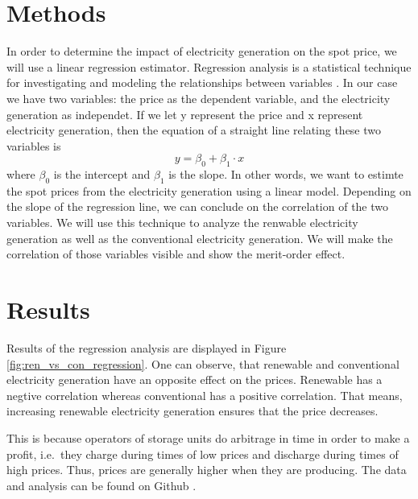 \documentclass{article}
\begin{document}
\section{Methods}

In order to determine the impact of electricity generation on the spot price, we will use a linear regression estimator. 
Regression analysis is a statistical technique for investigating and modeling the relationships between variables \citep{montgomery2021introduction}. 
In our case we have two variables: the price as the dependent variable, and the electricity generation as independet.
If we let y represent the price and x represent electricity generation, then the equation of a straight line relating these two variables is 
\begin{equation}
    y = \beta_0 + \beta_1\cdot x
\end{equation}
where $\beta_0$ is the intercept and $\beta_1$ is the slope.
In other words, we want to estimte the spot prices from the electricity generation using a linear model.
Depending on the slope of the regression line, we can conclude on the correlation of the two variables. 
We will use this technique to analyze the renwable electricity generation as well as the conventional electricity generation.
We will make the correlation of those variables visible and show the merit-order effect. 


\section{Results}

Results of the regression analysis are displayed in Figure \ref{fig:ren_vs_con_regression}. 
One can observe, that renewable and conventional electricity generation have an opposite effect on the prices. 
Renewable has a negtive correlation whereas conventional has a positive correlation. 
That means, increasing renewable electricity generation ensures that the price decreases.

This is because operators of storage units do arbitrage in time in order to make a profit, i.e.\ they charge during times of low prices and discharge during times of high prices.
Thus, prices are generally higher when they are producing.
The data and analysis can be found on Github \citep{github_repo}.
\end{document}
